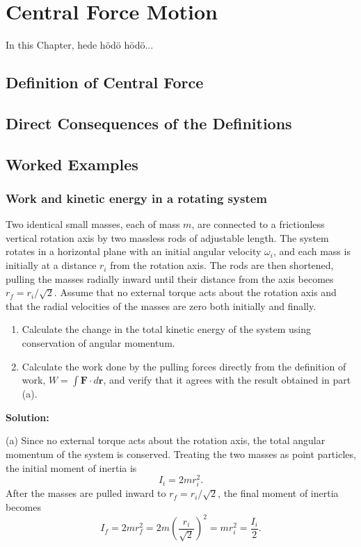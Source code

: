 \documentclass[../main.tex]{subfiles}
\begin{document}
\chapter{Central Force Motion}

In this Chapter, hede hödö hödö...



\section{Definition of Central Force}

\section{Direct Consequences of the Definitions}

\section{Worked Examples}
\subsection{Work and kinetic energy in a rotating system}

Two identical small masses, each of mass $m$, are connected to a frictionless vertical rotation axis by two massless rods of adjustable length. The system rotates in a horizontal plane with an initial angular velocity $\omega_i$, and each mass is initially at a distance $r_i$ from the rotation axis. The rods are then shortened, pulling the masses radially inward until their distance from the axis becomes $r_f=r_i/\sqrt{2}$. Assume that no external torque acts about the rotation axis and that the radial velocities of the masses are zero both initially and finally.

\begin{enumerate}
    \item[(a)] Calculate the change in the total kinetic energy of the system using conservation of angular momentum.
    \item[(b)] Calculate the work done by the pulling forces directly from the definition of work, $W=\int\mathbf{F}\cdot d\mathbf{r}$, and verify that it agrees with the result obtained in part (a).
\end{enumerate}

\textbf{Solution:}

(a) Since no external torque acts about the rotation axis, the total angular momentum of the system is conserved. Treating the two masses as point particles, the initial moment of inertia is
\begin{equation}
    I_i=2mr_i^2.
\end{equation}
After the masses are pulled inward to $r_f=r_i/\sqrt{2}$, the final moment of inertia becomes
\begin{equation}
    I_f=2mr_f^2
    =2m\left(\frac{r_i}{\sqrt{2}}\right)^2
    =mr_i^2
    =\frac{I_i}{2}.
\end{equation}
\end{document}
